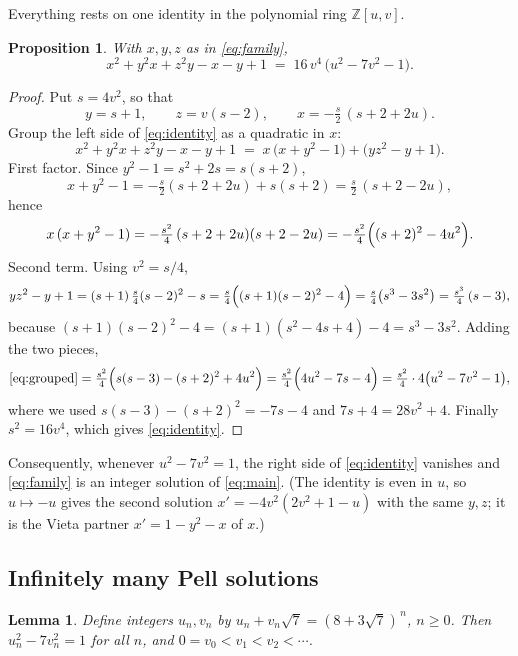 \documentclass[11pt]{article}
\newtheorem{lemma}[theorem]{Lemma}
\newtheorem{proposition}[theorem]{Proposition}
\theoremstyle{remark}
\begin{document}
Everything rests on one identity in the polynomial ring $\mathbb{Z}[u,v]$.

\begin{proposition}\label{prop:identity}
With $x,y,z$ as in \eqref{eq:family},
\begin{equation}\label{eq:identity}
x^{2}+y^{2}x+z^{2}y-x-y+1 \;=\; 16\,v^{4}\,\bigl(u^{2}-7v^{2}-1\bigr).
\end{equation}
\end{proposition}

\begin{proof}
Put $s=4v^{2}$, so that
\[
y=s+1,\qquad z=v(s-2),\qquad x=-\tfrac{s}{2}\,(s+2+2u).
\]
Group the left side of \eqref{eq:identity} as a quadratic in $x$:
\begin{equation}\label{eq:grouped}
x^{2}+y^{2}x+z^{2}y-x-y+1 \;=\; x\,\bigl(x+y^{2}-1\bigr)+\bigl(yz^{2}-y+1\bigr).
\end{equation}
First factor. Since $y^{2}-1=s^{2}+2s=s(s+2)$,
\[
x+y^{2}-1=-\tfrac{s}{2}(s+2+2u)+s(s+2)=\tfrac{s}{2}\,(s+2-2u),
\]
hence
\[
x\,(x+y^{2}-1)=-\tfrac{s^{2}}{4}\,(s+2+2u)(s+2-2u)=-\tfrac{s^{2}}{4}\Bigl((s+2)^{2}-4u^{2}\Bigr).
\]
Second term. Using $v^{2}=s/4$,
\[
yz^{2}-y+1=(s+1)\,\tfrac{s}{4}(s-2)^{2}-s=\tfrac{s}{4}\Bigl((s+1)(s-2)^{2}-4\Bigr)
=\tfrac{s}{4}\bigl(s^{3}-3s^{2}\bigr)=\tfrac{s^{3}}{4}\,(s-3),
\]
because $(s+1)(s-2)^{2}-4=(s+1)(s^{2}-4s+4)-4=s^{3}-3s^{2}$.
Adding the two pieces,
\[
\eqref{eq:grouped}=\tfrac{s^{2}}{4}\Bigl(s(s-3)-(s+2)^{2}+4u^{2}\Bigr)
=\tfrac{s^{2}}{4}\Bigl(4u^{2}-7s-4\Bigr)
=\tfrac{s^{2}}{4}\cdot 4\bigl(u^{2}-7v^{2}-1\bigr),
\]
where we used $s(s-3)-(s+2)^{2}=-7s-4$ and $7s+4=28v^{2}+4$.
Finally $s^{2}=16v^{4}$, which gives \eqref{eq:identity}.
\end{proof}

Consequently, whenever $u^{2}-7v^{2}=1$, the right side of \eqref{eq:identity} vanishes and
\eqref{eq:family} is an integer solution of \eqref{eq:main}. (The identity is even in $u$,
so $u\mapsto -u$ gives the second solution $x'=-4v^{2}(2v^{2}+1-u)$ with the same $y,z$;
it is the Vieta partner $x'=1-y^{2}-x$ of $x$.)

\subsection{Infinitely many Pell solutions}

\begin{lemma}\label{lem:pell}
Define integers $u_n,v_n$ by $u_n+v_n\sqrt7=(8+3\sqrt7)^{\,n}$, $n\ge 0$. Then
$u_n^{2}-7v_n^{2}=1$ for all $n$, and $0=v_0<v_1<v_2<\cdots$.
\end{lemma}
\end{document}

